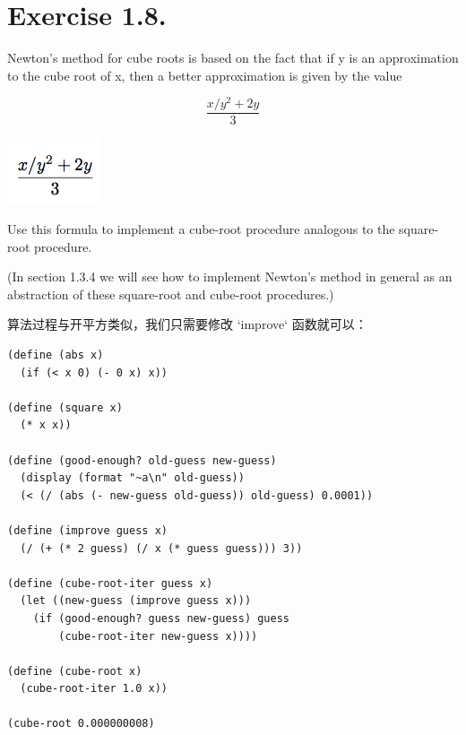 \documentclass[11pt]{article}
\begin{document}
\section{Exercise 1.8.}
\label{sec-8}


  Newton's method for cube roots is based on the fact that if y is an
  approximation to the cube root of x, then a better approximation is
  given by the value

\begin{equation}
\frac{x/y^2 + 2y}{3}
\end{equation}

\includegraphics[width=.9\linewidth]{exercise-1.8.png}

  Use this formula to implement a cube-root procedure analogous to the
  square-root procedure.

  (In section 1.3.4 we will see how to implement
  Newton's method in general as an abstraction of these square-root and
  cube-root procedures.)

算法过程与开平方类似，我们只需要修改 `improve` 函数就可以：


\begin{verbatim}
(define (abs x)
  (if (< x 0) (- 0 x) x))

(define (square x)
  (* x x))

(define (good-enough? old-guess new-guess)
  (display (format "~a\n" old-guess))
  (< (/ (abs (- new-guess old-guess)) old-guess) 0.0001))

(define (improve guess x)
  (/ (+ (* 2 guess) (/ x (* guess guess))) 3))

(define (cube-root-iter guess x)
  (let ((new-guess (improve guess x)))
    (if (good-enough? guess new-guess) guess
        (cube-root-iter new-guess x))))

(define (cube-root x)
  (cube-root-iter 1.0 x))

(cube-root 0.000000008)
\end{verbatim}
\end{document}
